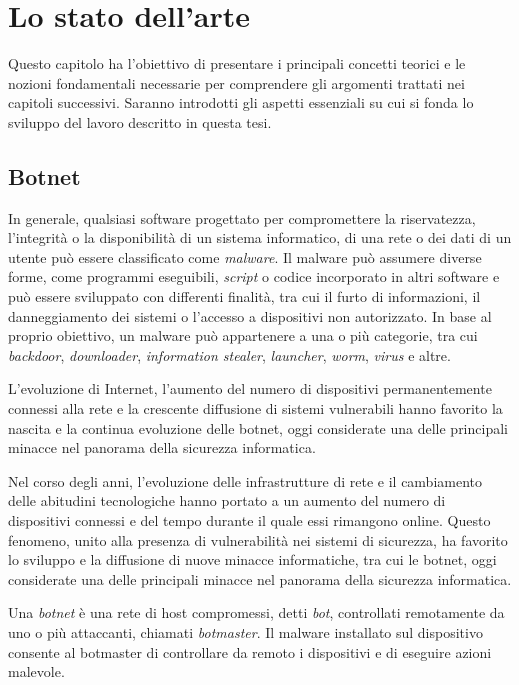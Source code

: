 \chapter{Lo stato dell'arte} %

Questo capitolo ha l'obiettivo di presentare i principali concetti teorici e le nozioni fondamentali necessarie per comprendere gli argomenti trattati nei capitoli successivi. Saranno introdotti gli aspetti essenziali su cui si fonda lo sviluppo del lavoro descritto in questa tesi.

\section{Botnet} %

In generale, qualsiasi software progettato per compromettere la riservatezza, l'integrità o la disponibilità di un sistema informatico, di una rete o dei dati di un utente può essere classificato come \textit{malware}. Il malware può assumere diverse forme, come programmi eseguibili, \textit{script} o codice incorporato in altri software e può essere sviluppato con differenti finalità, tra cui il furto di informazioni, il danneggiamento dei sistemi o l'accesso a dispositivi non autorizzato. In base al proprio obiettivo, un malware può appartenere a una o più categorie, tra cui \textit{backdoor}, \textit{downloader}, \textit{information stealer}, \textit{launcher}, \textit{worm}, \textit{virus} e altre. \cite{sikorski2012practical} %

L'evoluzione di Internet, l'aumento del numero di dispositivi permanentemente connessi alla rete e la crescente diffusione di sistemi vulnerabili hanno favorito la nascita e la continua evoluzione delle botnet, oggi considerate una delle principali minacce nel panorama della sicurezza informatica.

Nel corso degli anni, l'evoluzione delle infrastrutture di rete e il cambiamento delle abitudini tecnologiche hanno portato a un aumento del numero di dispositivi connessi e del tempo durante il quale essi rimangono online. Questo fenomeno, unito alla presenza di vulnerabilità nei sistemi di sicurezza, ha favorito lo sviluppo e la diffusione di nuove minacce informatiche, tra cui le botnet, oggi considerate una delle principali minacce nel panorama della sicurezza informatica.

Una \textit{botnet} è una rete di host compromessi, detti \textit{bot}, controllati remotamente da uno o più attaccanti, chiamati \textit{botmaster}. Il malware installato sul dispositivo consente al botmaster di controllare da remoto i dispositivi e di eseguire azioni malevole. \cite{silva2013botnets} %

